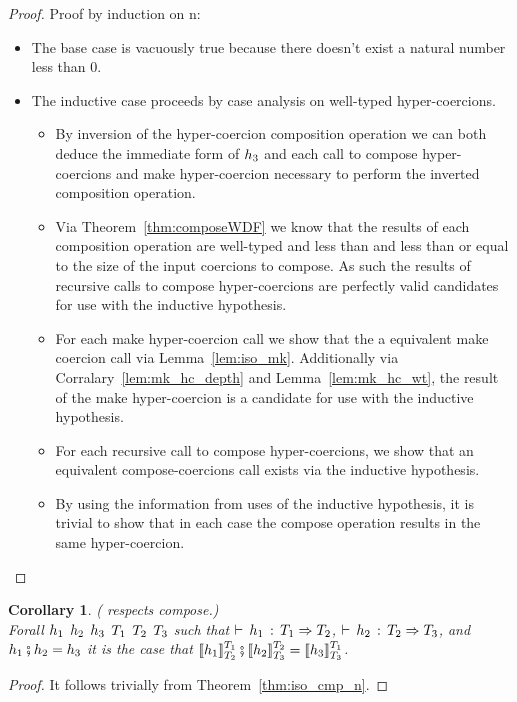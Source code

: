 \documentclass[acmtog, authorversion, acmlarge]{acmart}
\newtheorem{cor}{Corollary}
\begin{document}
\begin{proof}
  Proof by induction on n:
  \begin{itemize}
  \item The base case is vacuously true because there doesn't exist
    a natural number less than $0$.
  \item The inductive case proceeds by case analysis on well-typed
    hyper-coercions.
    \begin{itemize}
      \item By inversion of the hyper-coercion composition operation
        we can both deduce the immediate form of $\HC_3$ and each call
        to compose hyper-coercions and make hyper-coercion necessary
        to perform the inverted composition operation.
      \item Via Theorem~\ref{thm:composeWDF} we know that the results
        of each composition operation are well-typed and less than and
        less than or equal to the size of the input coercions to
        compose.  As such the results of recursive calls to compose
        hyper-coercions are perfectly valid candidates for use with
        the inductive hypothesis.
      \item For each make hyper-coercion call we show that the a
        equivalent make coercion call via Lemma~\ref{lem:iso_mk}.
        Additionally via Corralary~\ref{lem:mk_hc_depth} and
        Lemma~\ref{lem:mk_hc_wt}, the result
        of the make hyper-coercion is a candidate for
        use with the inductive hypothesis. 
      \item For each recursive call to compose hyper-coercions,
        we show that an equivalent compose-coercions call exists
        via the inductive hypothesis.
      \item By using the information from uses of the inductive
        hypothesis, it is trivial to show that in each case the
        compose operation results in the same hyper-coercion. 
    \end{itemize}
  \end{itemize}
\end{proof}

\begin{cor}
  \label{thm:iso_cmp}
  ( respects compose.)\\
  Forall $\HC_1$ $\HC_2$ $\HC_3$ $\T_1$ $\T_2$ $\T_3$ such that
  $\cwt{\HC_1}{\T_1}{\T_2}$, $\cwt{\HC_2}{\T_2}{\T_3}$, and
  $\cmp{\HC_1}{\HC_2} = \HC_3$ it is the case that
  $\cmp{\interp{\HC_1}{\T_1}{\T_2}}{\interp{\HC_2}{\T_2}{\T_3}}
   = \interp{\HC_3}{\T_1}{\T_3}$. 
\end{cor}
\begin{proof}
  It follows trivially from Theorem~\ref{thm:iso_cmp_n}. 
\end{proof}
\end{document}
